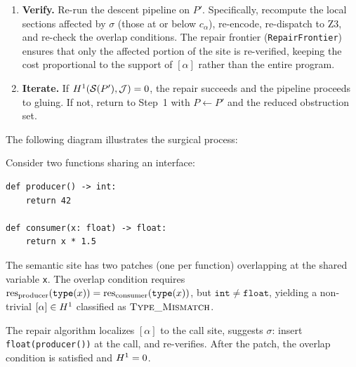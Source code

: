 \begin{construction}
\begin{enumerate}[label=\textbf{Step \arabic*.},leftmargin=*]
  \item \textbf{Verify.}
    Re-run the descent pipeline on $P'$.  Specifically, recompute
    the local sections affected by $\sigma$ (those at or below
    $c_\alpha$), re-encode, re-dispatch to Z3, and re-check the
    overlap conditions.  The repair frontier
    (\texttt{RepairFrontier}) ensures that only the affected portion
    of the site is re-verified, keeping the cost proportional to the
    support of $[\alpha]$ rather than the entire program.

  \item \textbf{Iterate.}
    If $H^{1}(\mathcal{S}(P'), \mathcal{J}) = 0$, the repair succeeds and the
    pipeline proceeds to gluing.  If not, return to Step~1 with
    $P \leftarrow P'$ and the reduced obstruction set.
\end{enumerate}
\end{construction}

The following diagram illustrates the surgical process:

\begin{center}
\end{center}

\begin{example}\label{ex:type-repair}
Consider two functions sharing an interface:

\begin{lstlisting}[style=jugeo-python,caption={Buggy program with type mismatch.}]
def producer() -> int:
    return 42

def consumer(x: float) -> float:
    return x * 1.5
\end{lstlisting}

\noindent
The semantic site has two patches (one per function) overlapping at the
shared variable \texttt{x}.  The overlap condition requires
$\mathrm{res}_{\text{producer}}(\mathtt{type}(x)) =
 \mathrm{res}_{\text{consumer}}(\mathtt{type}(x))$, but
$\mathtt{int} \neq \mathtt{float}$, yielding a non-trivial
$[\alpha] \in H^{1}$ classified as $\textsc{Type\_Mismatch}$.

The repair algorithm localizes $[\alpha]$ to the call site, suggests
$\sigma$: insert \texttt{float(producer())} at the call, and
re-verifies.  After the patch, the overlap condition is satisfied
and $H^{1} = 0$.
\end{example}

